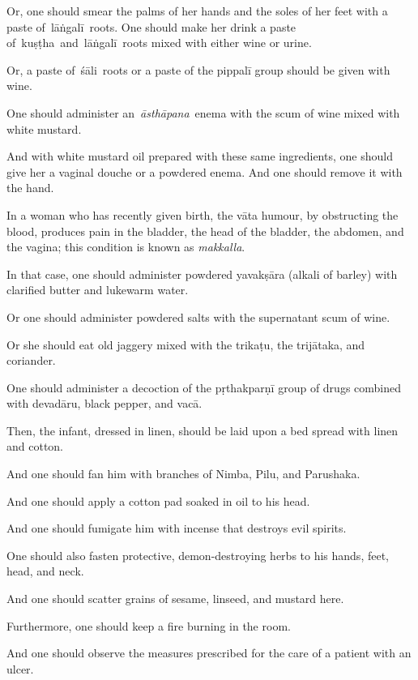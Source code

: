 \begin{translation}
\begin{tt}
Or, one should smear the palms of her hands and the soles of her feet
with a paste of~\gls{lāṅgalī}~roots. One should make her drink a paste
of~\gls{kuṣṭha}~and~\gls{lāṅgalī}~roots mixed with either wine or
urine.

Or, a paste of~\gls{śāli}~roots or a paste of
the \gls{pippalī} group should be given with wine.

One should administer an~\emph{āsthāpana}~enema with the scum of wine
mixed with white mustard.

And with white mustard oil prepared with these same ingredients, one
should give her a vaginal douche or a powdered enema. And one should
remove it with the hand.

\item[22]

In a woman who has recently given birth, the vāta humour, by obstructing
the blood, produces pain in the bladder, the head of the bladder, the
abdomen, and the vagina; this condition is known as \emph{makkalla}.

In that case, one should administer powdered \gls{yavakṣāra} (alkali of
barley) with clarified butter and lukewarm water.

Or one should administer powdered salts with the supernatant scum of
wine.

Or she should eat old jaggery mixed with the \gls{trikaṭu}, the \gls{trijātaka}, and
coriander.

One should administer a decoction of the \gls{pṛthakparṇī} group of drugs
combined with \gls{devadāru}, black pepper, and \gls{vacā}.

\item[23]

Then, the infant, dressed in linen, should be laid upon a bed spread
with linen and cotton.

And one should fan him with branches of Nimba, Pilu, and Parushaka.

And one should apply a cotton pad soaked in oil to his head.

And one should fumigate him with incense that destroys evil spirits.

One should also fasten protective, demon-destroying herbs to his hands,
feet, head, and neck.

And one should scatter grains of sesame, linseed, and mustard here.

Furthermore, one should keep a fire burning in the room.

And one should observe the measures prescribed for the care of a patient
with an ulcer.


\end{tt}
\end{translation}
